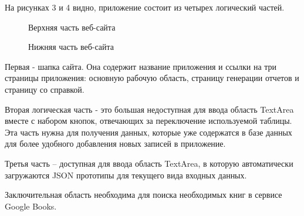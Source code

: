 На рисунках 3 и 4 видно, приложение состоит из четырех логический частей. 

\begin{figure}[h]
    \caption{Верхняя часть веб-сайта}
    \label{ris:image}
\end{figure}

\begin{figure}[h]
    \caption{Нижняя часть веб-сайта}
    \label{ris:image}
\end{figure}

Первая - шапка сайта. Она содержит название 
приложения и ссылки на три страницы приложения: основную рабочую область, страницу генерации отчетов и страницу со 
справкой.

Вторая логическая часть - это большая недоступная для ввода область TextArea вместе с набором кнопок, 
отвечающих за переключение используемой таблицы. Эта часть нужна для получения данных, которые 
уже содержатся в базе данных для более удобного добавления новых записей в приложение.

Третья часть -- доступная для ввода область TextArea, в которую автоматически загружаются
JSON прототипы для текущего вида входных данных.

Заключительная область необходима для поиска необходимых книг в сервисе Google Books.
